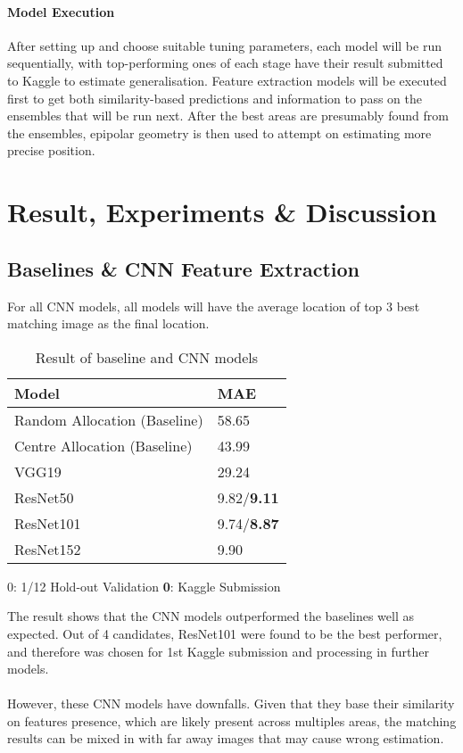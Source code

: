\documentclass[11pt]{article}
\begin{document}
\begin{multicols}{2}
\paragraph{Model Execution} After setting up and choose suitable tuning parameters, each model will be run sequentially, with top-performing ones of each stage have their result submitted to Kaggle to estimate generalisation. Feature extraction models will be executed first to get both similarity-based predictions and information to pass on the ensembles that will be run next. After the best areas are presumably found from the ensembles, epipolar geometry is then used to attempt on estimating more precise position.

\vspace{-0.4cm}
\section{Result, Experiments \& Discussion}

\subsection{Baselines \& CNN Feature Extraction}
\noindent For all CNN models, all models will have the average location of top 3 best matching image as the final location.

\begin{table}[H]
\centering
\caption{Result of baseline and CNN models}
\vspace{-0.4cm}
\begin{tabular}{|l|l|}
\hline
\textbf{Model} & \textbf{MAE} \\ \hline
Random Allocation (Baseline) & 58.65 \\ \hline
Centre Allocation (Baseline) & 43.99 \\ \hline
VGG19 & 29.24 \\ \hline
ResNet50 &  9.82/\textbf{9.11}\\ \hline
ResNet101 & 9.74/\textbf{8.87} \\ \hline
ResNet152 &  9.90 \\ \hline
\end{tabular}
\parbox{0.45\textwidth}{\centering\small 0: 1/12 Hold-out Validation \;\; \textbf{0}: Kaggle Submission}
\end{table}

\noindent The result shows that the CNN models outperformed the baselines well as expected. Out of 4 candidates, ResNet101 were found to be the best performer, and therefore was chosen for 1st Kaggle submission and processing in further models.\\~\\
However, these CNN models have downfalls. Given that they base their similarity on features presence, which are likely present across multiples areas, the matching results can be mixed in with far away images that may cause wrong estimation.


\end{multicols}
\end{document}

